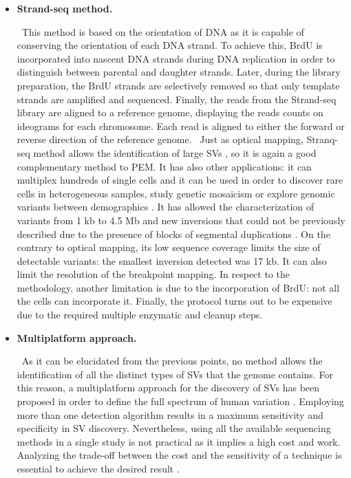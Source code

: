 \documentclass[a4paper,12pt]{article}
\begin{document}
\begin{itemize}
\item {\bf Strand-seq method.}

\
This method is based on the orientation of DNA as it is capable of conserving the orientation of each DNA strand. To achieve this, BrdU is incorporated into nascent DNA strands during DNA replication in order to distinguish between parental and daughter strands. Later, during the library preparation, the BrdU strands are selectively removed so that only template strands are amplified and sequenced. Finally, the reads from the Strand-seq library are aligned to a reference genome, displaying the reads counts on ideograms for each chromosome. Each read is aligned to either the forward or reverse direction of the reference genome.  
\
Just as optical mapping, Stranq-seq method allows the identification of large SVs \cite{sanders_characterizing_2016}, so it is again a good complementary method to PEM. It has also other applications: it can multiplex hundreds of single cells and it can be used in order to discover rare cells in heterogeneous samples, study genetic mosaicism or explore genomic variants between demographics \cite{sanders_characterizing_2016}. It has allowed the characterization of variants from 1 kb to 4.5 Mb and new inversions that could not be previously described due to the presence of blocks of segmental duplications \cite{sanders_characterizing_2016}. On the contrary to optical mapping, its low sequence coverage limits the size of detectable variants: the smallest inversion detected was 17 kb. It can also limit the resolution of the breakpoint mapping. In respect to the methodology, another limitation is due to the incorporation of BrdU: not all the cells can incorporate it. Finally, the protocol turns out to be expensive due to the required multiple enzymatic and cleanup steps.

\item {\bf Multiplatform approach.} 

\
As it can be elucidated from the previous points, no method allows the identification of all the distinct types of SVs that the genome contains. For this reason, a multiplatform approach for the discovery of SVs has been proposed in order to define the full spectrum of human variation \cite{chaisson_multi-platform_2019}. Employing more than one detection algorithm results in a maximum sensitivity and specificity in SV discovery. Nevertheless, using all the available sequencing methods in a single study is not practical as it implies a high cost and work. Analyzing the trade-off between the cost and the sensitivity of a technique is essential to achieve the desired result \cite{chaisson_multi-platform_2019}. 
\end{itemize}
\end{document}
